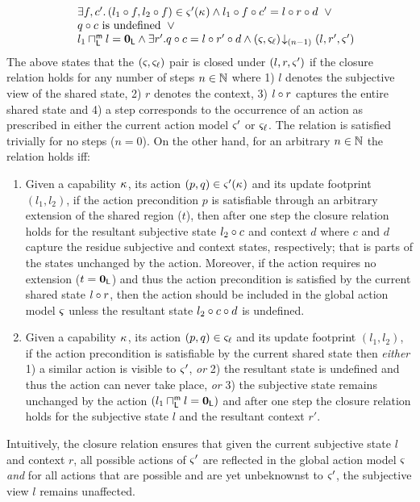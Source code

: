 \begin{definition}
\[\begin{array}{l}
  \hspace*{0.4cm}\exists f, c'.\, (l_1 \circ f, l_2 \circ f) \in \varsigma_{}'(\kappa_{}) \land l_1 \circ f \circ c' =  l \circ r \circ d \;\;\lor\\
	

		\hspace*{0.4cm}q \circ c \text{ is undefined} \;\;\lor\\
		\hspace*{0.4cm}l_1 \sqcap_{\textsf{L}}^{\textsf{m}} l = \mathbf{0}_{\textsf{L}} \land \exists r'.\,\! q \circ c = l \circ r' \circ d \land \left(\varsigma_{}, \varsigma_{\ell}\right) \!\downarrow_{(n-1)} \left(l, r', \varsigma_{}'\right)

\end{array}
\]
%
The above states that the $(\varsigma_{}, \varsigma_{\ell})$ pair is closed under $(l, r, \varsigma_{}')$ if the closure relation holds for any number of steps $n \in \mathbb{N}$ where 1) $l$ denotes the subjective view of the shared state, 2) $r$ denotes the context, 3) $l \circ r$ captures the entire shared state  and 4) a step corresponds to the occurrence of an action as prescribed in either the current action model $\varsigma_{}'$ or $\varsigma_{\ell}$. The relation is satisfied trivially for no steps ($n = 0$). On the other hand, for an arbitrary $n\in \mathbb{N}$ the relation holds iff:
\begin{enumerate}
	\item Given a capability $\kappa_{}$, its action $(p, q) \in \varsigma_{}'(\kappa_{})$ and its update footprint $(l_1, l_2)$, if the action precondition $p$ is satisfiable through an arbitrary extension of the shared region ($t$), then after one step the closure relation holds for the resultant subjective state $l_2 \circ c$ and context $d$ where $c$ and $d$ capture the residue subjective and context states, respectively; that is parts of the states unchanged by the action. Moreover, if the action requires no extension ($t = \mathbf{0}_{\textsf{L}}$) and thus the action precondition is satisfied by the current shared state $l \circ r$, then the action should be included in the global action model $\varsigma_{}$ unless the resultant state $l_2 \circ c \circ d$ is undefined.
	
	\item Given a capability $\kappa_{}$, its action $(p, q) \in \varsigma_{\ell}$ and its update footprint $(l_1, l_2)$, if the action precondition is satisfiable by the current shared state then \emph{either} 1) a similar action is visible to $\varsigma_{}'$, \emph{or} 2) the resultant state is undefined and thus the action can never take place, \emph{or} 3) the subjective state remains unchanged by the action $(l_1 \sqcap_{\textsf{L}}^{\textsf{m}} l = \mathbf{0}_{\textsf{L}} )$ and after one step the closure relation holds for the subjective state $l$ and the resultant context $r'$.
\end{enumerate}
%
Intuitively, the closure relation ensures that given the current subjective state $l$ and context $r$, all possible actions of $\varsigma_{}'$ are reflected in the global action model $\varsigma_{}$ \emph{and} for all actions that are possible and are yet unbeknownst to $\varsigma_{}'$, the subjective view $l$ remains unaffected.
\end{definition}

